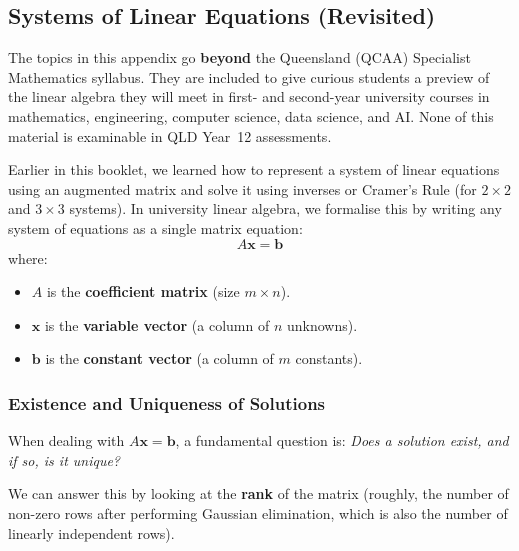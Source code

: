 \subsection{Systems of Linear Equations (Revisited)}

\begin{remarkbox}[title={\bfseries Enrichment Material}]
The topics in this appendix go \textbf{beyond} the Queensland (QCAA) Specialist Mathematics syllabus. They are included to give curious students a preview of the linear algebra they will meet in first- and second-year university courses in mathematics, engineering, computer science, data science, and AI. None of this material is examinable in QLD Year~12 assessments.
\end{remarkbox}

Earlier in this booklet, we learned how to represent a system of linear equations using an augmented matrix and solve it using inverses or Cramer's Rule (for $2 \times 2$ and $3 \times 3$ systems). In university linear algebra, we formalise this by writing any system of equations as a single matrix equation:
\[ A\mathbf{x} = \mathbf{b} \]
where:
\begin{itemize}[leftmargin=*]
    \item $A$ is the \textbf{coefficient matrix} (size $m \times n$).
    \item $\mathbf{x}$ is the \textbf{variable vector} (a column of $n$ unknowns).
    \item $\mathbf{b}$ is the \textbf{constant vector} (a column of $m$ constants).
\end{itemize}

\subsubsection*{Existence and Uniqueness of Solutions}

When dealing with $A\mathbf{x} = \mathbf{b}$, a fundamental question is: \emph{Does a solution exist, and if so, is it unique?}

We can answer this by looking at the \textbf{rank} of the matrix (roughly, the number of non-zero rows after performing Gaussian elimination, which is also the number of linearly independent rows).

